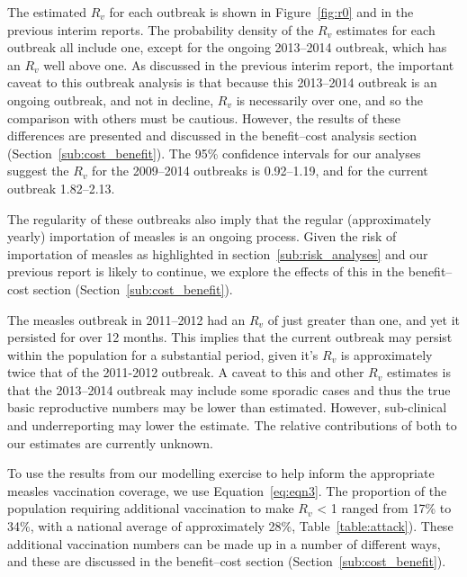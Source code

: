 \documentclass{article}
\begin{document}
The estimated $R_v$ for each outbreak is shown in Figure~\ref{fig:r0} and in the previous interim reports. The probability density of the $R_v$ estimates for each outbreak all include one, except for the ongoing 2013--2014 outbreak, which has an $R_v$ well above one. As discussed in the previous interim report, the important caveat to this outbreak analysis is that because this 2013--2014 outbreak is an ongoing outbreak, and not in decline, $R_v$ is necessarily over one, and so the comparison with others must be cautious. However, the results of these differences are presented and discussed in the benefit--cost analysis section (Section~\ref{sub:cost_benefit}). The 95\% confidence intervals for our analyses suggest the $R_v$ for the 2009--2014 outbreaks is 0.92--1.19, and for the current outbreak 1.82--2.13.

The regularity of these outbreaks also imply that the regular (approximately yearly) importation of measles is an ongoing process. Given the risk of importation of measles as highlighted in section~\ref{sub:risk_analyses} and our previous report is likely to continue, we explore the effects of this in the benefit--cost section (Section~\ref{sub:cost_benefit}).

The measles outbreak in 2011--2012 had an $R_v$ of just greater than one, and yet it persisted for over 12 months. This implies that the current outbreak may persist within the population for a substantial period, given it's $R_v$ is approximately twice that of the 2011-2012 outbreak. A caveat to this and other $R_v$ estimates is that the 2013--2014 outbreak may include some sporadic cases and thus the true basic reproductive numbers may be lower than estimated. However, sub-clinical and underreporting may lower the estimate. The relative contributions of both to our estimates are currently unknown.

To use the results from our modelling exercise to help inform the appropriate measles vaccination coverage, we use Equation~\ref{eq:eqn3}. The proportion of the population requiring additional vaccination to make $R_v$ < 1 ranged from 17\% to 34\%, with a national average of approximately 28\%, Table~\ref{table:attack}). These additional vaccination numbers can be made up in a number of different ways, and these are discussed in the benefit--cost section (Section~\ref{sub:cost_benefit}).
\end{document}

